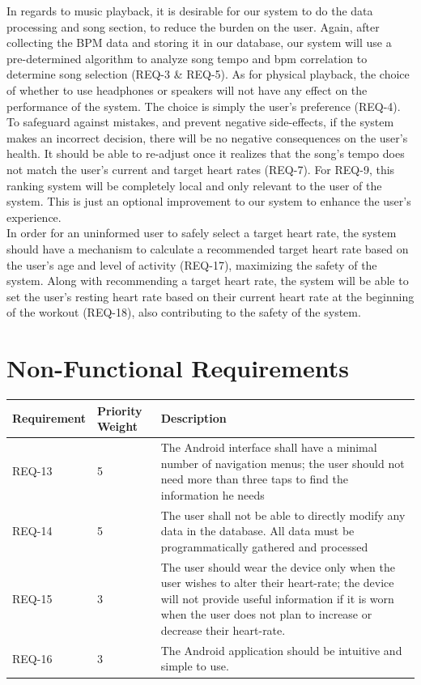 \documentclass[letterpaper,english, 12pt]{scrreprt}
\begin{document}
In regards to music playback, it is desirable for our system to do the data processing and song section, to reduce the burden on the user. Again, after collecting the BPM data and storing it in our database, our system will use a pre-determined algorithm to analyze song tempo and bpm correlation to determine song selection (REQ-3 \& REQ-5). As for physical playback, the choice of whether to use headphones or speakers will not have any effect on the performance of the system. The choice is simply the user's preference (REQ-4).\\

To safeguard against mistakes, and prevent negative side-effects, if the system makes an incorrect decision, there will be no negative consequences on the user's health. It should be able to re-adjust once it realizes that the song's tempo does not match the user's current and target heart rates (REQ-7). For REQ-9, this ranking system will be completely local and only relevant to the user of the system. This is just an optional improvement to our system to enhance the user's experience.\\

In order for an uninformed user to safely select a target heart rate, the system should have a mechanism to calculate a recommended target heart rate based on the user's age and level of activity (REQ-17), maximizing the safety of the system. Along with recommending a target heart rate, the system will be able to set the user's resting heart rate based on their current heart rate at the beginning of the workout (REQ-18), also contributing to the safety of the system. \\


\section{Non-Functional Requirements}
\begin{center}
	\begin{tabular}{|C{2cm}|C{2cm}|C{8cm}|}
		\hline
			Requirement & Priority Weight & Description \\
		\hline
			REQ-13 & 5 & The Android interface shall have a minimal number of navigation menus; the user should not need more than three taps to find the information he needs \\
		\hline
			REQ-14 & 5 & The user shall not be able to directly modify any data in the database. All data must be programmatically gathered and processed \\
		\hline
			REQ-15 & 3 & The user should wear the device only when the user wishes to alter their heart-rate; the device will not provide useful information if it is worn when the user does not plan to increase or decrease their heart-rate. \\
		\hline
			REQ-16 & 3 & The Android application should be intuitive and simple to use. \\
		\hline
	\end{tabular}
\end{center}
\end{document}
